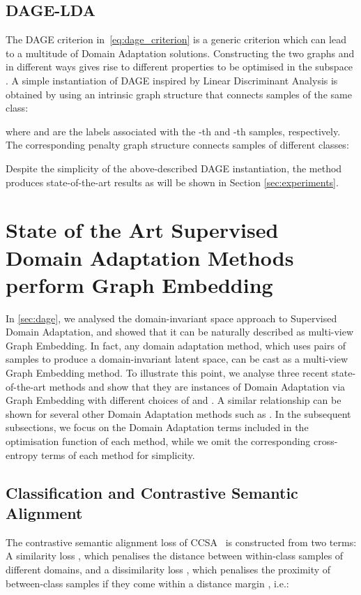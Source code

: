 \documentclass[journal]{IEEEtran}
\begin{document}
\subsection{DAGE-LDA} \label{sec:dage-lda}
The DAGE criterion in~\cref{eq:dage_criterion} is a generic criterion which can lead to a multitude of Domain Adaptation solutions. Constructing the two graphs  and  in different ways gives rise to different properties to be optimised in the subspace . A simple instantiation of DAGE inspired by Linear Discriminant Analysis is obtained by using an intrinsic graph structure that connects samples of the same class:

where  and  are the labels associated with the -th and -th samples, respectively. The corresponding penalty graph structure connects samples of different classes:

Despite the simplicity of the above-described DAGE instantiation, the method produces state-of-the-art results as will be shown in Section \ref{sec:experiments}.  


\section{State of the Art Supervised Domain Adaptation Methods perform Graph Embedding}\label{sec:sota-as-ge}
In \cref{sec:dage}, we analysed the domain-invariant space approach to Supervised Domain Adaptation, and showed that it can be naturally described as multi-view Graph Embedding. In fact, any domain adaptation method, which uses pairs of samples to produce a domain-invariant latent space, can be cast as a multi-view Graph Embedding method.
To illustrate this point, we analyse three recent state-of-the-art methods and show that they are instances of Domain Adaptation via Graph Embedding with different choices of  and . A similar relationship can be shown for several other Domain Adaptation methods such as \cite{das2018graph, koniusz2017domain}. In the subsequent subsections, we focus on the Domain Adaptation terms included in the optimisation function of each method, while we omit the corresponding cross-entropy terms of each method for simplicity.


\subsection{Classification and Contrastive Semantic Alignment} \label{sec:dage-ccsa}
The contrastive semantic alignment loss of CCSA~\cite{motiian2017ccsa} is constructed from two terms: A similarity loss , which penalises the distance between within-class samples of different domains, and a dissimilarity loss , which penalises the proximity of between-class samples if they come within a distance margin , i.e.:
\end{document}
